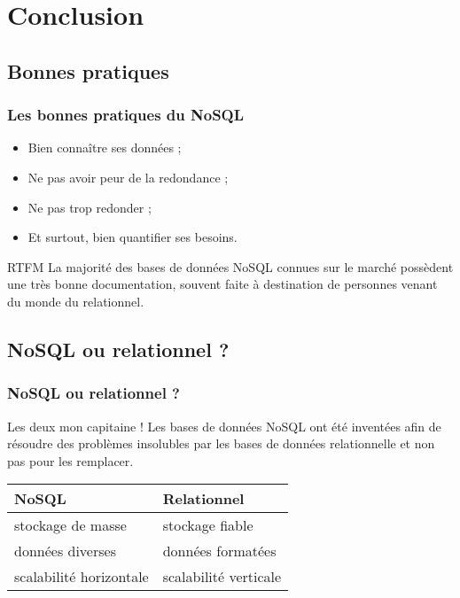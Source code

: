 \section{Conclusion}

	\subsection{Bonnes pratiques}
	\begin{frame}
		\frametitle{Les bonnes pratiques du NoSQL}

		\begin{itemize}
			\item Bien connaître ses données ;
			\item Ne pas avoir peur de la redondance ;
			\item Ne pas trop redonder ;
			\item Et surtout, bien quantifier ses besoins.
		\end{itemize}


		\begin{alertblock}{RTFM}
			La majorité des bases de données NoSQL connues sur le marché possèdent une très bonne documentation, souvent faite à destination de personnes venant du monde du relationnel.
		\end{alertblock}
	\end{frame}

	\subsection{NoSQL ou relationnel ?}
		\begin{frame}
			\frametitle{NoSQL ou relationnel ?}

			\begin{alertblock}{Les deux mon capitaine !}
				Les bases de données NoSQL ont été inventées afin de résoudre des problèmes insolubles par les bases de données relationnelle et non pas pour les remplacer.
			\end{alertblock}

			\vspace{20px}

			\begin{tabular}{|l|l|}
				\hline
				\textbf{NoSQL} & \textbf{Relationnel} \\ \hline\hline
				stockage de masse & stockage fiable \\ \hline
				données diverses & données formatées \\ \hline
				scalabilité horizontale & scalabilité verticale \\ \hline
			\end{tabular}
		\end{frame}


